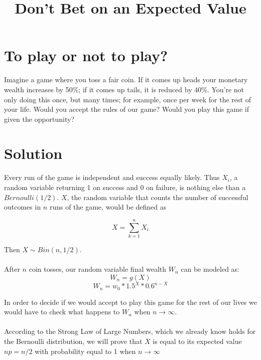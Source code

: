\documentclass[12pt]{article}
\title{Don't Bet on an Expected Value}
\begin{document}
\maketitle
{}

\section{To play or not to play?}

Imagine a game where you toss a fair coin. If it comes up heads your monetary wealth increases by 50\%; if it comes up tails, it is reduced by 40\%. You’re not only doing this once, but many times; for example, once per week for the rest of your life. Would you accept the rules of our game? Would you play this game if given the opportunity?

\section{Solution}
Every run of the game is independent and success equally likely. Thus $X_i$, a random variable returning 1 on success and 0 on failure, is nothing else than a $Bernoulli(1/2)$. $X$, the random variable that counts the number of successful outcomes in $n$ runs of the game, would be defined as

\begin{equation*}
 X = \sum\limits_{k=1}^{n} X_i
\end{equation*}

Then $X \sim Bin(n, 1/2)$.
\\\\
After $n$ coin tosses, our random variable final wealth $W_n$ can be modeled as:
\begin{equation*}
  W_n = g(X)
\end{equation*}
\begin{equation*}
  W_n = w_0 * 1.5^X * 0.6^{n-X}
\end{equation*}

In order to decide if we would accept to play this game for the rest of our lives we would have to check what happens to $W_n$ when $n \rightarrow \infty$.
\\\\
According to the Strong Law of Large Numbers, which we already know holds for the Bernoulli distribution, we will prove that $X$ is equal to its expected value $np = n/2$ with probability equal to 1 when $n \rightarrow \infty$
\end{document}
